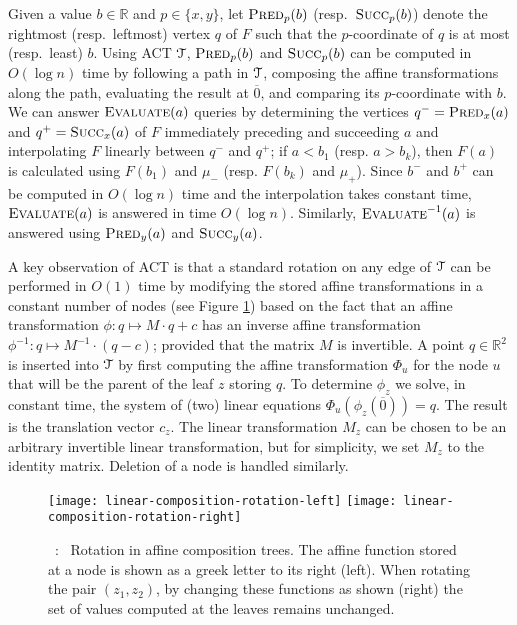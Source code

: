 \documentclass[11pt]{article}
\def\bb{b}
\def\tvec{c}
\def\amat{M}
\def\qq{q}
\def\uu{u}
\def\zz{{\text{\boldmath $z$}}}
\def\pred{\mathop{\text{\sc Predecessor}}}
\def\succ{\mathop{\text{\sc Sucessor}}}
\def\TT{\EuScript{T}}
\def\reals{\mathbb{R}}
\def\zz{z}
\def\eval{\mathop{\mbox{\textsc{Evaluate}}}}
\def\evali{\mathop{\mbox{\textsc{Evaluate}}}^{-1}}
\def\pred{\mathop{\textsc{Pred}}}
\def\succ{\mathop{\textsc{Succ}}}
\newcommand\myCaption[1]{\small\refstepcounter{figure}\figurename\ \thefigure :\ #1}
\begin{document}
Given a value $b \in \reals$ and $p \in \{x,y\}$, let $\pred_p(b)$ (resp.\ $\succ_p(b)$) denote the rightmost (resp.\ leftmost) vertex $q$ of $F$ such that the $p$-coordinate of  $q$ is at most (resp.\ least) $b$.
Using ACT $\TT$, $\pred_p(b)$ and $\succ_p(b)$ can be computed in $O(\log n)$ time by following a path in $\TT$, composing the affine transformations along the path, evaluating the result at $\overline{0}$, and comparing its $p$-coordinate with $b$.
We can answer $\eval(a)$ queries by  determining the vertices $\qq^- = \pred_x(a)$ and $\qq^+ = \succ_x(a)$ of $F$ immediately preceding and succeeding $a$ and interpolating $F$ linearly between $\qq^-$ and $\qq^+$; if $a < b_1$ (resp. $a > b_k$), then $F(a)$ is calculated using $F(b_1)$ and $\mu_-$ (resp. $F(\bb_k)$ and $\mu_+$). 
Since $\bb^-$ and $\bb^+$ can be computed in $O(\log n)$ time and the interpolation takes constant time, $\eval(a)$ is answered in time $O(\log n)$. Similarly, $\evali(a)$ is answered using $\pred_y(a)$ and $\succ_y(a)$.


A key observation of ACT is that a standard rotation on any edge of $\TT$ can be performed in $O(1)$ time by modifying the stored affine transformations in a constant number of nodes (see Figure \ref{fig:rotation}) based on the fact that an affine transformation $\phi: \qq \mapsto \amat \cdot \qq + \tvec$ has an inverse affine transformation $\phi^{-1}: \qq \mapsto \amat^{-1}\cdot (\qq - \tvec)$; provided that the matrix $\amat$ is invertible.
A point $\qq \in \mathbb{R}^2$ is inserted into $\TT$ by first computing the affine transformation $\Phi_\uu$ for the node $\uu$ that will be the parent of the leaf $\zz$ storing $\qq$.  To determine $\phi_\zz$ we solve, in constant time, the system of (two) linear equations $\Phi_\uu(\phi_\zz(\overline{0})) = \qq$.  The result is the translation vector $\tvec_\zz$.  The linear transformation $\amat_\zz$ can be chosen to be an arbitrary invertible linear transformation, but for simplicity, we set $\amat_\zz$ to the identity matrix. Deletion of a node is handled similarly. 

\begin{figure}[b]
\begin{center}
\texttt{[image: linear-composition-rotation-left]}\qquad\qquad
\texttt{[image: linear-composition-rotation-right]}
\end{center}
\myCaption{\label{fig:rotation} Rotation in affine composition trees. The affine function stored at a node is shown as a greek letter to its right (left). When rotating the pair $(z_1, z_2)$, by changing these functions as shown (right) the set of values computed at the leaves remains unchanged. }
\end{figure}
\end{document}
